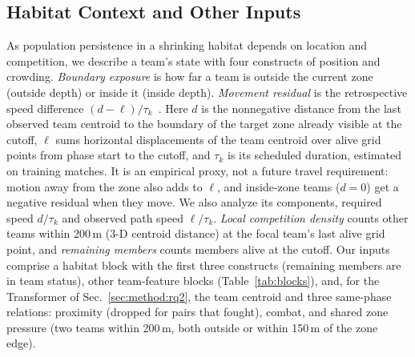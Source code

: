 \documentclass[sigconf,anonymous,nonacm]{acmart}
\begin{document}
\subsection{Habitat Context and Other Inputs}
\label{sec:method:representation}
As population persistence in a shrinking habitat depends on location and competition, we describe a team's state with four constructs of position and crowding.
\emph{Boundary exposure} is how far a team is outside the current zone (outside depth) or inside it (inside depth).
\emph{Movement residual} is the retrospective speed difference $(d-\ell)/\tau_k$~\cite{Nathan08}. Here $d$ is the nonnegative distance from the last observed team centroid to the boundary of the target zone already visible at the cutoff, $\ell$ sums horizontal displacements of the team centroid over alive grid points from phase start to the cutoff, and $\tau_k$ is its scheduled duration, estimated on training matches. It is an empirical proxy, not a future travel requirement: motion away from the zone also adds to $\ell$, and inside-zone teams ($d=0$) get a negative residual when they move. We also analyze its components, required speed $d/\tau_k$ and observed path speed $\ell/\tau_k$.
\emph{Local competition density} counts other teams within 200\,m (3-D centroid distance) at the focal team's last alive grid point, and \emph{remaining members} counts members alive at the cutoff.
Our inputs comprise a habitat block with the first three constructs (remaining members are in team status), other team-feature blocks (Table~\ref{tab:blocks}), and, for the Transformer of Sec.~\ref{sec:method:rq2}, the team centroid and three same-phase relations: proximity (dropped for pairs that fought), combat, and shared zone pressure (two teams within 200\,m, both outside or within 150\,m of the zone edge).
\end{document}
